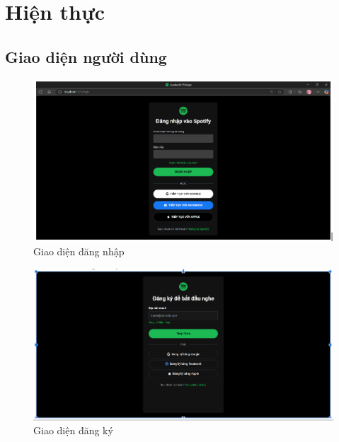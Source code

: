 \chapter{Hiện thực}
\label{ch:implementation}

\section{Giao diện người dùng}
\label{sec:frontend_implementation}

\begin{figure}
    \centering
    \includegraphics[width=1\linewidth]{images/ui-login.png}
    \caption{Giao diện đăng nhập}
    \label{fig:ui-login}
\end{figure}

\begin{figure}
    \centering
    \includegraphics[width=1\linewidth]{images/ui-signup.png}
    \caption{Giao diện đăng ký}
    \label{fig:ui-signup.png}
\end{figure}

